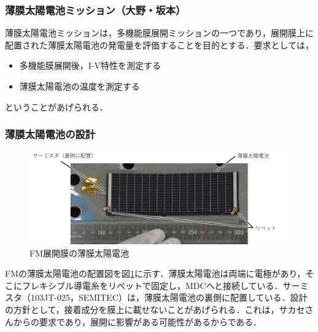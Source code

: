 \subsubsection{薄膜太陽電池ミッション（大野・坂本）}
薄膜太陽電池ミッションは，多機能膜展開ミッションの一つであり，展開膜上に配置された薄膜太陽電池の発電量を評価することを目的とする．要求としては，
\begin{itemize}
	\item 多機能膜展開後，I-V特性を測定する
	\item 薄膜太陽電池の温度を測定する
\end{itemize}
ということがあげられる．

\subsubsection*{薄膜太陽電池の設計}
\begin{figure}[H]
	\centering
	\includegraphics[scale=0.5]{03/fig/FM_TFSC.jpg}
	\caption{FM展開膜の薄膜太陽電池}
	\label{fig3-9-3-1}
\end{figure}
FMの薄膜太陽電池の配置図を図\ref{fig3-9-3-1}に示す．薄膜太陽電池は両端に電極があり，そこにフレキシブル導電糸をリベットで固定し，MDCへと接続している．サーミスタ（103JT-025，SEMITEC）は，薄膜太陽電池の裏側に配置している．設計の方針として，接着成分を膜上に載せないことがあげられる．これは，サカセさんからの要求であり，展開に影響がある可能性があるからである．

